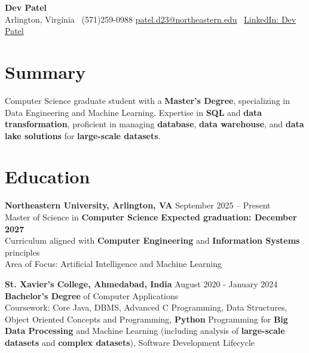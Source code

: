 \documentclass[a4paper,10pt]{article}
\begin{document}
\begin{center}
\vspace{-3mm}
    \fontsize{16}{18}\selectfont \textbf{Dev Patel} \\
    \vspace{0mm}
    \normalsize Arlington, Virginia \textbar\ (571)259-0988  \textbar       \href{mailto:patel.d23@northeastern.edu}{patel.d23@northeastern.edu} \textbar\ \href{https://www.linkedin.com/in/devxpatel//}{LinkedIn: Dev Patel} \\
\end{center}



\section*{Summary}
Computer Science graduate student with a \textbf{Master's Degree}, specializing in Data Engineering and Machine Learning. Expertise in \textbf{SQL} and \textbf{data transformation}, proficient in managing \textbf{database}, \textbf{data warehouse}, and \textbf{data lake solutions} for \textbf{large-scale datasets}.
 
\vspace{ 0 mm}
\section*{Education}
\textbf{Northeastern University, Arlington, VA} \hfill September 2025 -- Present\\
Master of Science in \textbf{Computer Science} \hfill \textbf{Expected graduation: December 2027} \\
Curriculum aligned with \textbf{Computer Engineering} and \textbf{Information Systems} principles \\
Area of Focus: Artificial Intelligence and Machine Learning

\vspace{1 mm} %
\textbf{St. Xavier's College, Ahmedabad, India} \hfill August 2020 - January 2024 \\
\textbf{Bachelor’s Degree} of Computer Applications\\
Coursework: Core Java, DBMS, Advanced C Programming, Data Structures, Object Oriented Concepts and Programming, \textbf{Python} Programming for \textbf{Big Data Processing} and Machine Learning (including analysis of \textbf{large-scale datasets} and \textbf{complex datasets}), Software Development Lifecycle
\end{document}

